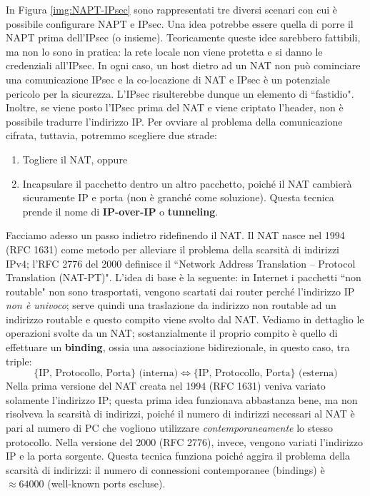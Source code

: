 In Figura \ref{img:NAPT-IPsec} sono rappresentati tre diversi scenari con cui è possibile configurare NAPT e IPsec. Una idea potrebbe essere quella di porre il NAPT prima dell'IPsec (o insieme). Teoricamente queste idee sarebbero fattibili, ma non lo sono in pratica: la rete locale non viene protetta e si danno le credenziali all'IPsec. In ogni caso, un host dietro ad un NAT non può cominciare una comunicazione IPsec e la co-locazione di NAT e IPsec è un potenziale pericolo per la sicurezza. L'IPsec risulterebbe dunque un elemento di \textquotedblleft fastidio". Inoltre, se viene posto l'IPsec prima del NAT e viene criptato l'header, non è possibile tradurre l'indirizzo IP. Per ovviare al problema della comunicazione cifrata, tuttavia, potremmo scegliere due strade:
\begin{enumerate}
	\item Togliere il NAT, oppure
	\item Incapsulare il pacchetto dentro un altro pacchetto, poiché il NAT cambierà sicuramente IP e porta (non è granché come soluzione). Questa tecnica prende il nome di \textbf{IP-over-IP} o \textbf{tunneling}.
\end{enumerate}
Facciamo adesso un passo indietro ridefinendo il NAT. Il NAT nasce nel 1994 (RFC 1631) come metodo per alleviare il problema della scarsità di indirizzi IPv4; l'RFC 2776 del 2000 definisce il \textquotedblleft Network Address Translation -- Protocol Translation (NAT-PT)". L'idea di base è la seguente: in Internet i pacchetti \textquotedblleft non routable" non sono trasportati, vengono scartati dai router perché l'indirizzo IP \textit{non è univoco}; serve quindi una traslazione da indirizzo non routable ad un indirizzo routable e questo compito viene svolto dal NAT. Vediamo in dettaglio le operazioni svolte da un NAT; sostanzialmente il proprio compito è quello di effettuare un \textbf{binding}, ossia una associazione bidirezionale, in questo caso, tra triple:
$$\{\text{IP, Protocollo, Porta}\}\text{ (interna)} \Longleftrightarrow \{\text{IP, Protocollo, Porta}\}\text{ (esterna)}$$
Nella prima versione del NAT creata nel 1994 (RFC 1631) veniva variato solamente l'indirizzo IP; questa prima idea funzionava abbastanza bene, ma non risolveva la scarsità di indirizzi, poiché il numero di indirizzi necessari al NAT è pari al numero di PC che vogliono utilizzare \textit{contemporaneamente} lo stesso protocollo. Nella versione del 2000 (RFC 2776), invece, vengono variati l'indirizzo IP e la porta sorgente. Questa tecnica funziona poiché aggira il problema della scarsità di indirizzi: il numero di connessioni contemporanee (bindings) è $\approx 64000$ (well-known ports escluse).

